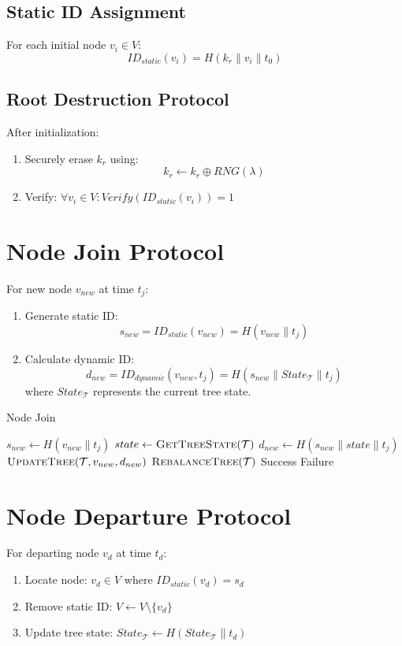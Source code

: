 \documentclass[12pt]{article}
\theoremstyle{definition}
\theoremstyle{remark}
\begin{document}
\subsection{Static ID Assignment}
For each initial node $v_i \in V$:
\[ID_{static}(v_i) = H(k_r \parallel v_i \parallel t_0)\]

\subsection{Root Destruction Protocol}
After initialization:
\begin{enumerate}
    \item Securely erase $k_r$ using:
    \[k_r \leftarrow k_r \oplus RNG(\lambda)\]
    \item Verify: $\forall v_i \in V: Verify(ID_{static}(v_i)) = 1$
\end{enumerate}

\section{Node Join Protocol}
For new node $v_{new}$ at time $t_j$:
\begin{enumerate}
    \item Generate static ID:
    \[s_{new} = ID_{static}(v_{new}) = H(v_{new} \parallel t_j)\]
    \item Calculate dynamic ID:
    \[d_{new} = ID_{dynamic}(v_{new}, t_j) = H(s_{new} \parallel State_{\mathcal{T}} \parallel t_j)\]
    where $State_{\mathcal{T}}$ represents the current tree state.
\end{enumerate}

\begin{algorithm}
\caption{Node Join}
\begin{algorithmic}[1]
    \State $s_{new} \gets H(v_{new} \parallel t_j)$
    \State $state \gets \textsc{GetTreeState}(\mathcal{T})$
    \State $d_{new} \gets H(s_{new} \parallel state \parallel t_j)$
        \State $\textsc{UpdateTree}(\mathcal{T}, v_{new}, d_{new})$
        \State $\textsc{RebalanceTree}(\mathcal{T})$
        \State \Return Success
    \EndIf
    \State \Return Failure
\EndProcedure
\end{algorithmic}
\end{algorithm}

\section{Node Departure Protocol}
For departing node $v_d$ at time $t_d$:
\begin{enumerate}
    \item Locate node: $v_d \in V$ where $ID_{static}(v_d) = s_d$
    \item Remove static ID: $V \leftarrow V \setminus \{v_d\}$
    \item Update tree state: $State_{\mathcal{T}} \leftarrow H(State_{\mathcal{T}} \parallel t_d)$
\end{enumerate}
\end{document}
